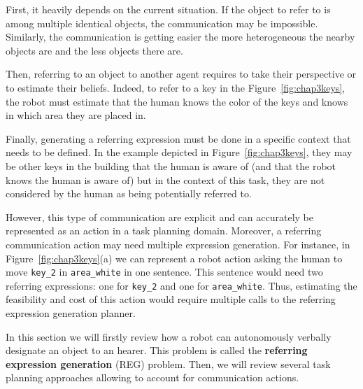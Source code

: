 \documentclass[a4paper,11pt,twoside]{StyleThese}
\begin{document}
First, it heavily depends on the current situation. If the object to refer to is among multiple identical objects, the communication may be impossible. Similarly, the communication is getting easier the more heterogeneous the nearby objects are and the less objects there are. 

Then, referring to an object to another agent requires to take their perspective or to estimate their beliefs. Indeed, to refer to a key in the Figure~\ref{fig:chap3keys}, the robot must estimate that the human knows the color of the keys and knows in which area they are placed in.

Finally, generating a referring expression must be done in a specific context that needs to be defined. In the example depicted in Figure~\ref{fig:chap3keys}, they may be other keys in the building that the human is aware of (and that the robot knows the human is aware of) but in the context of this task, they are not considered by the human as being potentially referred to.

However, this type of communication are explicit and can accurately be represented as an action in a task planning domain. Moreover, a referring communication action may need multiple expression generation. For instance, in Figure~\ref{fig:chap3keys}(a) we can represent a robot action asking the human to move \verb'key_2' in \verb'area_white' in one sentence. This sentence would need two referring expressions: one for \verb'key_2' and one for \verb'area_white'. Thus, estimating the feasibility and cost of this action would require multiple calls to the referring expression generation planner.

In this section we will firstly review how a robot can autonomously verbally designate an object to an hearer. This problem is called the \textbf{referring expression generation} (REG) problem.
Then, we will review several task planning approaches allowing to account for communication actions.
\end{document}
